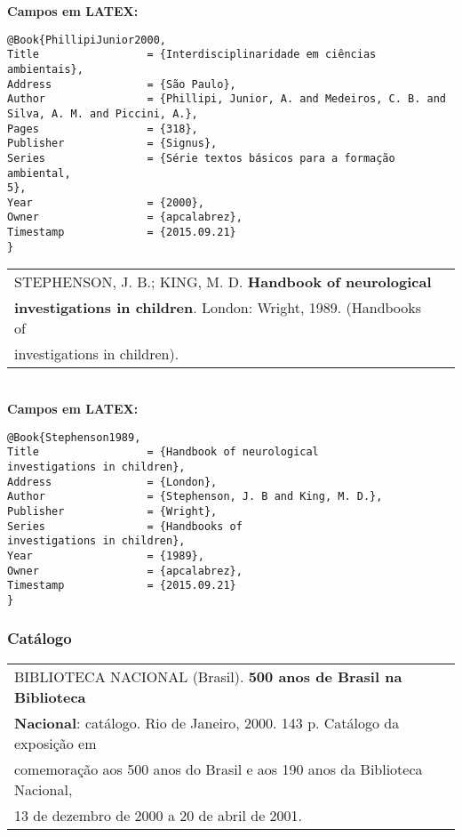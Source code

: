 \textbf{Campos em LATEX:}

\begin{verbatim}
@Book{PhillipiJunior2000,
Title                 = {Interdisciplinaridade em ciências ambientais},
Address               = {São Paulo},
Author                = {Phillipi, Junior, A. and Medeiros, C. B. and 
Silva, A. M. and Piccini, A.},
Pages                 = {318},
Publisher             = {Signus},
Series                = {Série textos básicos para a formação ambiental, 
5},
Year                  = {2000},
Owner                 = {apcalabrez},
Timestamp             = {2015.09.21}
}
\end{verbatim}

\begin{tabular}{|l|c|} \hline
STEPHENSON, J. B.; KING, M. D. \textbf{ Handbook of neurological}\\ \textbf{investigations in children}. London: Wright, 1989. (Handbooks of \\
investigations in children). \\\hline
\end{tabular}\\

\textbf{Campos em LATEX:}

\begin{verbatim}
@Book{Stephenson1989,
Title                 = {Handbook of neurological
investigations in children},
Address               = {London},
Author                = {Stephenson, J. B and King, M. D.},
Publisher             = {Wright},
Series                = {Handbooks of
investigations in children},
Year                  = {1989},
Owner                 = {apcalabrez},
Timestamp             = {2015.09.21}
}
\end{verbatim}


\subsubsection{Catálogo}

\begin{tabular}{|l|c|} \hline
	BIBLIOTECA NACIONAL (Brasil). \textbf{500 anos de Brasil na Biblioteca }\\ \textbf{Nacional}: catálogo. Rio de Janeiro, 2000. 143 p. Catálogo da exposição em \\comemoração aos 500  anos do Brasil e aos 190 anos da Biblioteca Nacional, \\13 de dezembro de 2000 a 20 de abril de 2001.    \\\hline
\end{tabular}\\

